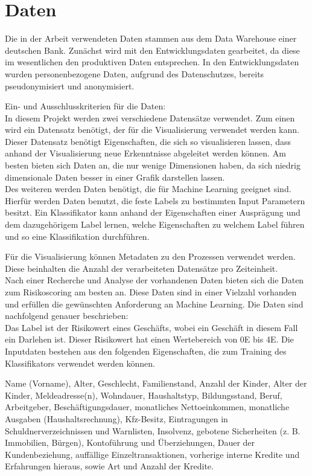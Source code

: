 \chapter{Daten}\label{ch:data}
Die in der Arbeit verwendeten Daten stammen aus dem Data Warehouse einer deutschen Bank.
Zunächst wird mit den Entwicklungsdaten gearbeitet, da diese im wesentlichen den produktiven Daten entsprechen.
In den Entwicklungsdaten wurden personenbezogene Daten, aufgrund des Datenschutzes, bereits pseudonymisiert und anonymisiert.


Ein- und Ausschlusskriterien für die Daten:\\
In diesem Projekt werden zwei verschiedene Datensätze verwendet. 
Zum einen wird ein Datensatz benötigt, der für die Visualisierung verwendet werden kann. 
Dieser Datensatz benötigt Eigenschaften, die sich so visualisieren lassen, dass anhand der Visualisierung neue Erkenntnisse abgeleitet werden können.
Am besten bieten sich Daten an, die nur wenige Dimensionen haben, da sich niedrig dimensionale Daten besser in einer Grafik darstellen lassen. 
\\
Des weiteren werden Daten benötigt, die für Machine Learning geeignet sind. 
Hierfür werden Daten benutzt, die feste Labels zu bestimmten Input Parametern besitzt.
Ein Klassifikator kann anhand der Eigenschaften einer Ausprägung und dem dazugehörigem Label lernen, welche Eigenschaften zu welchem Label führen und so eine Klassifikation durchführen. 


Für die Visualisierung können Metadaten zu den Prozessen verwendet werden.
Diese beinhalten die Anzahl der verarbeiteten Datensätze pro Zeiteinheit.
\\

Nach einer Recherche und Analyse der vorhandenen Daten bieten sich die Daten zum Risikoscoring am besten an.
Diese Daten sind in einer Vielzahl vorhanden und erfüllen die gewünschten Anforderung an Machine Learning. 
Die Daten sind nachfolgend genauer beschrieben: \\
Das Label ist der Risikowert eines Geschäfts, wobei ein Geschäft in diesem Fall ein Darlehen ist.
Dieser Risikowert hat einen Wertebereich von 0E bis 4E.
Die Inputdaten bestehen aus den folgenden Eigenschaften, die zum Training des Klassifikators verwendet werden können. 


 Name (Vorname), Alter, Geschlecht, Familienstand, Anzahl der Kinder,
Alter der Kinder, Meldeadresse(n), Wohndauer, Haushaltstyp, Bildungsstand, Beruf, Arbeitgeber, Beschäftigungsdauer, monatliches Nettoeinkommen, monatliche Ausgaben (Haushaltsrechnung), Kfz-Besitz, Eintragungen in Schuldnerverzeichnissen und Warnlisten, Insolvenz, gebotene Sicherheiten (z. B. Immobilien, Bürgen), Kontoführung und Überziehungen, Dauer der Kundenbeziehung, auffällige Einzeltransaktionen, vorherige interne
Kredite und Erfahrungen hieraus, sowie Art und Anzahl der Kredite. 

